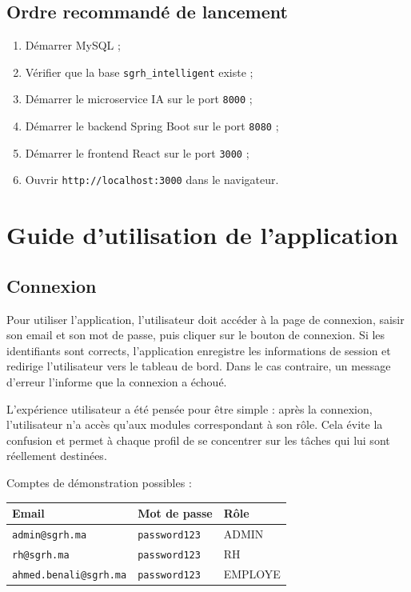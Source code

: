 \documentclass[12pt,a4paper]{report}
\begin{document}
\section{Ordre recommandé de lancement}

\begin{enumerate}
    \item Démarrer MySQL ;
    \item Vérifier que la base \texttt{sgrh\_intelligent} existe ;
    \item Démarrer le microservice IA sur le port \texttt{8000} ;
    \item Démarrer le backend Spring Boot sur le port \texttt{8080} ;
    \item Démarrer le frontend React sur le port \texttt{3000} ;
    \item Ouvrir \texttt{http://localhost:3000} dans le navigateur.
\end{enumerate}

\chapter{Guide d'utilisation de l'application}

\section{Connexion}

Pour utiliser l'application, l'utilisateur doit accéder à la page de connexion, saisir son email et son mot de passe, puis cliquer sur le bouton de connexion. Si les identifiants sont corrects, l'application enregistre les informations de session et redirige l'utilisateur vers le tableau de bord. Dans le cas contraire, un message d'erreur l'informe que la connexion a échoué.

L'expérience utilisateur a été pensée pour être simple : après la connexion, l'utilisateur n'a accès qu'aux modules correspondant à son rôle. Cela évite la confusion et permet à chaque profil de se concentrer sur les tâches qui lui sont réellement destinées.

Comptes de démonstration possibles :

\begin{longtable}{|p{5cm}|p{5cm}|p{4cm}|}
\hline
\textbf{Email} & \textbf{Mot de passe} & \textbf{Rôle} \\
\hline
\texttt{admin@sgrh.ma} & \texttt{password123} & ADMIN \\
\hline
\texttt{rh@sgrh.ma} & \texttt{password123} & RH \\
\hline
\texttt{ahmed.benali@sgrh.ma} & \texttt{password123} & EMPLOYE \\
\hline
\end{longtable}
\end{document}
